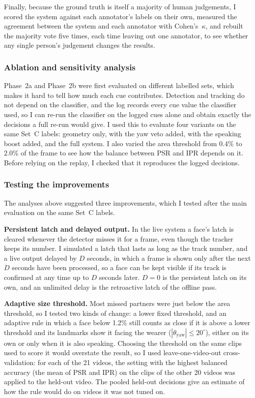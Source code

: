 Finally, because the ground truth is itself a majority of human judgements, I scored the
system against each annotator's labels on their own, measured the agreement between the
system and each annotator with Cohen's~$\kappa$, and rebuilt the majority vote five times,
each time leaving out one annotator, to see whether any single person's judgement changes
the results.

\subsubsection{Ablation and sensitivity analysis}
\label{sec:replay}

Phase~2a and Phase~2b were first evaluated on different labelled sets, which makes it hard
to tell how much each cue contributes. Detection and tracking do not depend on the
classifier, and the log records every cue value the classifier used, so I can re-run the
classifier on the logged cues alone and obtain exactly the decisions a full re-run would
give. I used this to evaluate four variants on the same Set~C labels: geometry only, with
the yaw veto added, with the speaking boost added, and the full system. I also varied the
area threshold from 0.4\% to 2.0\% of the frame to see how the balance between PSR and IPR
depends on it. Before relying on the replay, I checked that it reproduces the logged
decisions.

\subsubsection{Testing the improvements}
\label{sec:improve_method}

The analyses above suggested three improvements, which I tested after the main evaluation
on the same Set~C labels.

\textbf{Persistent latch and delayed output.} In the live system a face's latch is cleared
whenever the detector misses it for a frame, even though the tracker keeps its number. I
simulated a latch that lasts as long as the track number, and a live output delayed by
$D$ seconds, in which a frame is shown only after the next $D$ seconds have been
processed, so a face can be kept visible if its track is confirmed at any time up to $D$
seconds later. $D = 0$ is the persistent latch on its own, and an unlimited delay is the
retroactive latch of the offline pass.

\textbf{Adaptive size threshold.} Most missed partners were just below the area threshold,
so I tested two kinds of change: a lower fixed threshold, and an adaptive rule in which a
face below 1.2\% still counts as close if it is above a lower threshold and its landmarks
show it facing the wearer ($|\theta_{\mathrm{yaw}}| \le 20^\circ$), either on its own or
only when it is also speaking. Choosing the threshold on the same clips used to score it
would overstate the result, so I used leave-one-video-out cross-validation: for each of the
21 videos, the setting with the highest balanced accuracy (the mean of PSR and IPR) on the
clips of the other 20 videos was applied to the held-out video. The pooled held-out
decisions give an estimate of how the rule would do on videos it was not tuned on.

